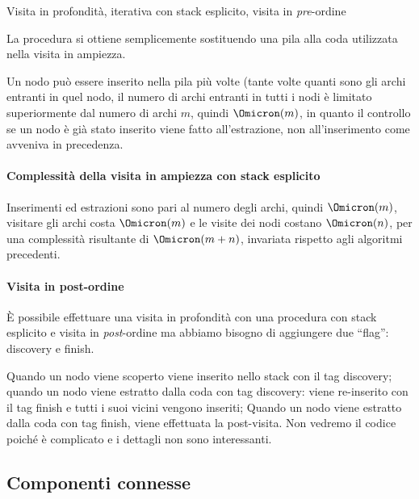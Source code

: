 \begin{algorithm}[h]
	\caption[Visita in profondità iterativa]{Visita in profondità, iterativa con stack esplicito, visita in \emph{pre}-ordine}
	
\end{algorithm}

La procedura si ottiene semplicemente sostituendo una pila alla coda utilizzata nella visita in ampiezza.

Un nodo può essere inserito nella pila più volte (tante volte quanti sono gli archi entranti in quel nodo, il numero di archi entranti in tutti i nodi è limitato superiormente dal numero di archi \(m\), quindi \(\Omicron(m)\), in quanto il controllo se un nodo è già stato inserito viene fatto all'estrazione, non all'inserimento come avveniva in precedenza.

\paragraph{Complessità della visita in ampiezza con stack esplicito}
Inserimenti ed estrazioni sono pari al numero degli archi, quindi \(\Omicron(m)\), visitare gli archi costa \(\Omicron(m)\) e le visite dei nodi costano \(\Omicron(n)\), per una complessità risultante di \(\Omicron(m+n)\), invariata rispetto agli algoritmi precedenti.

\paragraph{Visita in post-ordine}
\`{E} possibile effettuare una visita in profondità con una procedura con stack esplicito e visita in \emph{post}-ordine ma abbiamo bisogno di aggiungere due \enquote{flag}: \textsf{discovery} e \textsf{finish}.

Quando un nodo viene scoperto viene inserito nello stack con il tag \textsf{discovery};
quando un nodo viene estratto dalla coda con tag \textsf{discovery}: viene re-inserito con il tag \textsf{finish} e tutti i suoi vicini vengono inseriti;
Quando un nodo viene estratto dalla coda con tag \textsf{finish}, viene effettuata la post-visita.
Non vedremo il codice poiché è complicato e i dettagli non sono interessanti.


\clearpage
\subsection{Componenti connesse}

